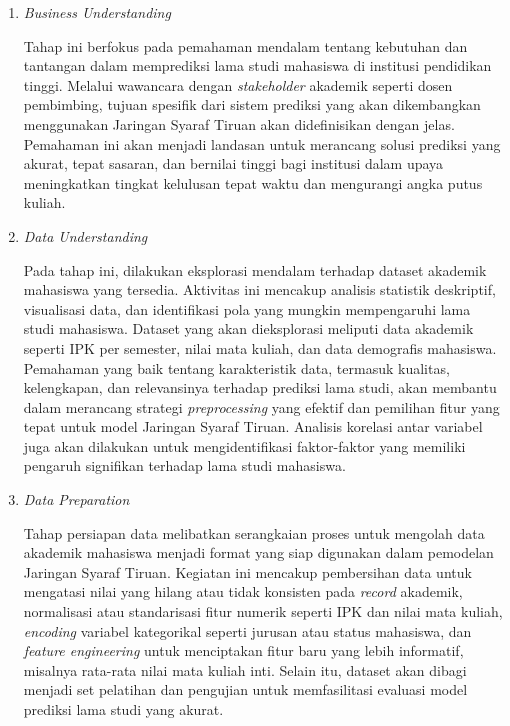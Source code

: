 \begin{enumerate}
    \item \textit{Business Understanding}
    
    Tahap ini berfokus pada pemahaman mendalam tentang kebutuhan dan tantangan dalam memprediksi lama studi mahasiswa di institusi pendidikan tinggi. Melalui wawancara dengan \textit{stakeholder} akademik seperti dosen pembimbing, tujuan spesifik dari sistem prediksi yang akan dikembangkan menggunakan Jaringan Syaraf Tiruan akan didefinisikan dengan jelas. Pemahaman ini akan menjadi landasan untuk merancang solusi prediksi yang akurat, tepat sasaran, dan bernilai tinggi bagi institusi dalam upaya meningkatkan tingkat kelulusan tepat waktu dan mengurangi angka putus kuliah.

    \item \textit{Data Understanding}
    
    Pada tahap ini, dilakukan eksplorasi mendalam terhadap dataset akademik mahasiswa yang tersedia. Aktivitas ini mencakup analisis statistik deskriptif, visualisasi data, dan identifikasi pola yang mungkin mempengaruhi lama studi mahasiswa. Dataset yang akan dieksplorasi meliputi data akademik seperti IPK per semester, nilai mata kuliah, dan data demografis mahasiswa. Pemahaman yang baik tentang karakteristik data, termasuk kualitas, kelengkapan, dan relevansinya terhadap prediksi lama studi, akan membantu dalam merancang strategi \textit{preprocessing} yang efektif dan pemilihan fitur yang tepat untuk model Jaringan Syaraf Tiruan. Analisis korelasi antar variabel juga akan dilakukan untuk mengidentifikasi faktor-faktor yang memiliki pengaruh signifikan terhadap lama studi mahasiswa.

    \item \textit{Data Preparation}
    
    Tahap persiapan data melibatkan serangkaian proses untuk mengolah data akademik mahasiswa menjadi format yang siap digunakan dalam pemodelan Jaringan Syaraf Tiruan. Kegiatan ini mencakup pembersihan data untuk mengatasi nilai yang hilang atau tidak konsisten pada \textit{record} akademik, normalisasi atau standarisasi fitur numerik seperti IPK dan nilai mata kuliah, \textit{encoding} variabel kategorikal seperti jurusan atau status mahasiswa, dan \textit{feature engineering} untuk menciptakan fitur baru yang lebih informatif, misalnya rata-rata nilai mata kuliah inti. Selain itu, dataset akan dibagi menjadi set pelatihan dan pengujian untuk memfasilitasi evaluasi model prediksi lama studi yang akurat.


\end{enumerate}
